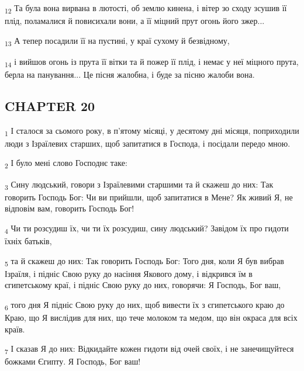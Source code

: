 \begin{tcolorbox}
\textsubscript{12} Та була вона вирвана в лютості, об землю кинена, і вітер зо сходу зсушив її плід, поламалися й повисихали вони, а її міцний прут огонь його зжер...
\end{tcolorbox}
\begin{tcolorbox}
\textsubscript{13} А тепер посадили її на пустині, у краї сухому й безвідному,
\end{tcolorbox}
\begin{tcolorbox}
\textsubscript{14} і вийшов огонь із прута її вітки та й пожер її плід, і немає у неї міцного прута, берла на панування... Це пісня жалобна, і буде за пісню жалоби вона.
\end{tcolorbox}
\subsection{CHAPTER 20}
\begin{tcolorbox}
\textsubscript{1} І сталося за сьомого року, в п'ятому місяці, у десятому дні місяця, поприходили люди з Ізраїлевих старших, щоб запитатися в Господа, і посідали передо мною.
\end{tcolorbox}
\begin{tcolorbox}
\textsubscript{2} І було мені слово Господнє таке:
\end{tcolorbox}
\begin{tcolorbox}
\textsubscript{3} Сину людський, говори з Ізраїлевими старшими та й скажеш до них: Так говорить Господь Бог: Чи ви прийшли, щоб запитатися в Мене? Як живий Я, не відповім вам, говорить Господь Бог!
\end{tcolorbox}
\begin{tcolorbox}
\textsubscript{4} Чи ти розсудиш їх, чи ти їх розсудиш, сину людський? Завідом їх про гидоти їхніх батьків,
\end{tcolorbox}
\begin{tcolorbox}
\textsubscript{5} та й скажеш до них: Так говорить Господь Бог: Того дня, коли Я був вибрав Ізраїля, і підніс Свою руку до насіння Якового дому, і відкрився їм в єгипетському краї, і підніс Свою руку до них, говорячи: Я Господь, Бог ваш,
\end{tcolorbox}
\begin{tcolorbox}
\textsubscript{6} того дня Я підніс Свою руку до них, щоб вивести їх з єгипетського краю до Краю, що Я вислідив для них, що тече молоком та медом, що він окраса для всіх країв.
\end{tcolorbox}
\begin{tcolorbox}
\textsubscript{7} І сказав Я до них: Відкидайте кожен гидоти від очей своїх, і не занечищуйтеся божками Єгипту. Я Господь, Бог ваш!
\end{tcolorbox}
